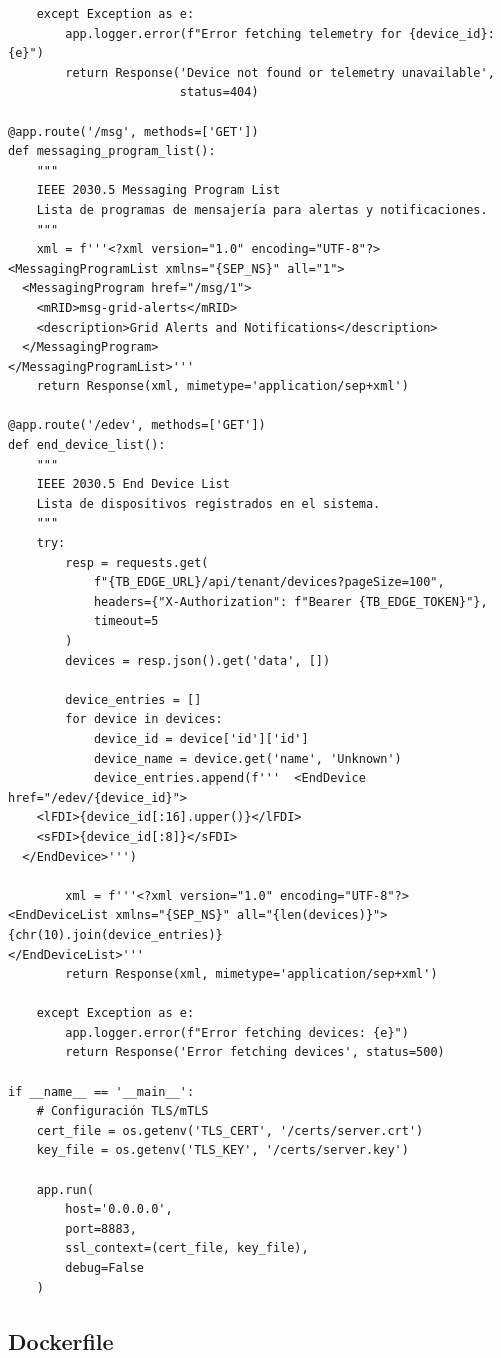 \begin{verbatim}
    except Exception as e:
        app.logger.error(f"Error fetching telemetry for {device_id}: {e}")
        return Response('Device not found or telemetry unavailable', 
                        status=404)

@app.route('/msg', methods=['GET'])
def messaging_program_list():
    """
    IEEE 2030.5 Messaging Program List
    Lista de programas de mensajería para alertas y notificaciones.
    """
    xml = f'''<?xml version="1.0" encoding="UTF-8"?>
<MessagingProgramList xmlns="{SEP_NS}" all="1">
  <MessagingProgram href="/msg/1">
    <mRID>msg-grid-alerts</mRID>
    <description>Grid Alerts and Notifications</description>
  </MessagingProgram>
</MessagingProgramList>'''
    return Response(xml, mimetype='application/sep+xml')

@app.route('/edev', methods=['GET'])
def end_device_list():
    """
    IEEE 2030.5 End Device List
    Lista de dispositivos registrados en el sistema.
    """
    try:
        resp = requests.get(
            f"{TB_EDGE_URL}/api/tenant/devices?pageSize=100",
            headers={"X-Authorization": f"Bearer {TB_EDGE_TOKEN}"},
            timeout=5
        )
        devices = resp.json().get('data', [])
        
        device_entries = []
        for device in devices:
            device_id = device['id']['id']
            device_name = device.get('name', 'Unknown')
            device_entries.append(f'''  <EndDevice href="/edev/{device_id}">
    <lFDI>{device_id[:16].upper()}</lFDI>
    <sFDI>{device_id[:8]}</sFDI>
  </EndDevice>''')
        
        xml = f'''<?xml version="1.0" encoding="UTF-8"?>
<EndDeviceList xmlns="{SEP_NS}" all="{len(devices)}">
{chr(10).join(device_entries)}
</EndDeviceList>'''
        return Response(xml, mimetype='application/sep+xml')
    
    except Exception as e:
        app.logger.error(f"Error fetching devices: {e}")
        return Response('Error fetching devices', status=500)

if __name__ == '__main__':
    # Configuración TLS/mTLS
    cert_file = os.getenv('TLS_CERT', '/certs/server.crt')
    key_file = os.getenv('TLS_KEY', '/certs/server.key')
    
    app.run(
        host='0.0.0.0',
        port=8883,
        ssl_context=(cert_file, key_file),
        debug=False
    )
\end{verbatim}

\subsection{Dockerfile}

